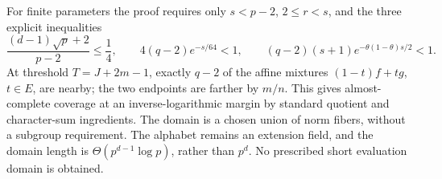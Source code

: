 For finite parameters the proof requires only $s<p-2$, $2\le r<s$,
and the three explicit inequalities
\[
 \frac{(d-1)\sqrt p+2}{p-2}\le\frac14,\qquad
 4(q-2)e^{-s/64}<1,\qquad
 (q-2)(s+1)e^{-\theta(1-\theta)s/2}<1.
\]
At threshold $T=J+2m-1$, exactly $q-2$ of the affine mixtures
$(1-t)f+tg$, $t\in E$, are nearby; the two endpoints are farther by
$m/n$.  This gives almost-complete coverage at an inverse-logarithmic
margin by standard quotient and character-sum ingredients.
The domain is a chosen union of norm fibers, without a subgroup
requirement.  The alphabet remains an extension field, and the domain
length is $\Theta(p^{d-1}\log p)$, rather than $p^d$.
No prescribed short evaluation domain is obtained.
